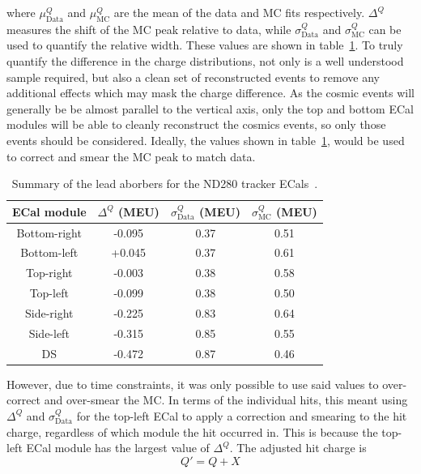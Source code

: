 where $\mu_{\textrm{Data}}^Q$ and $\mu_{\textrm{MC}}^Q$ are the mean of the data and MC fits respectively.  $\Delta^Q$ measures the shift of the MC peak relative to data, while $\sigma_{\textrm{Data}}^{Q}$ and $\sigma_{\textrm{MC}}^{Q}$ can be used to quantify the relative width.  These values are shown in table~\ref{table:HitChargeFitValues}.  To truly quantify the difference in the charge distributions, not only is a well understood sample required, but also a clean set of reconstructed events to remove any additional effects which may mask the charge difference.  As the cosmic events will generally be be almost parallel to the vertical axis, only the top and bottom ECal modules will be able to cleanly reconstruct the cosmics events, so only those events should be considered.  Ideally, the values shown in table~\ref{table:HitChargeFitValues}, would be used to correct and smear the MC peak to match data.  
\begin{table}
  \begin{tabular}{ c c c c }
   ECal module & $\Delta^{Q}$ (MEU) & $\sigma_{\textrm{Data}}^Q$ (MEU) & $\sigma_{\textrm{MC}}^Q$ (MEU) \\ \hline \hline
   Bottom-right & -0.095 & 0.37 & 0.51 \\
   Bottom-left & +0.045 & 0.37 & 0.61 \\
   Top-right & -0.003 & 0.38 & 0.58 \\
   Top-left & -0.099 & 0.38 & 0.50 \\ \hline
   Side-right & -0.225 & 0.83 & 0.64 \\
   Side-left & -0.315 & 0.85 & 0.55 \\
   DS & -0.472 & 0.87 & 0.46 \\
  \end{tabular}
  \caption{Summary of the lead aborbers for the ND280 tracker ECals~\cite{1748-0221-8-10-P10019}.}
  \label{table:HitChargeFitValues}
\end{table}
However, due to time constraints, it was only possible to use said values to over-correct and over-smear the MC.  In terms of the individual hits, this meant using $\Delta^{Q}$ and $\sigma_{\textrm{Data}}^Q$ for the top-left ECal to apply a correction and smearing to the hit charge, regardless of which module the hit occurred in.  This is because the top-left ECal module has the largest value of $\Delta^{Q}$.  The adjusted hit charge is
\begin{equation}
Q' = Q + X
\label{eqn:HitChargeCorrection}
\end{equation}

